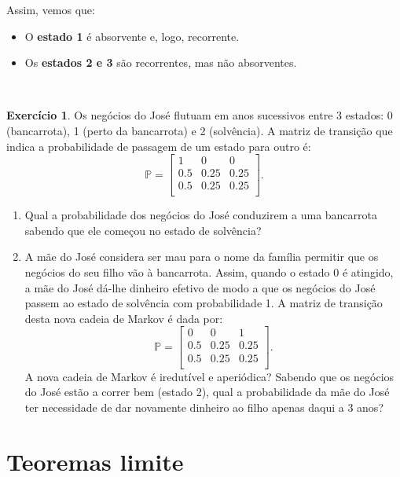 \documentclass[
  11pt,
  a4paper,
]{book}
\theoremstyle{definition}
\theoremstyle{definition}
\theoremstyle{definition}
\newtheorem{exercise}{Exercício}[chapter]
\theoremstyle{definition}
\theoremstyle{remark}
\begin{document}
Assim, vemos que:

\begin{itemize}
\item
  O \textbf{estado 1} é absorvente e, logo, recorrente.
\item
  Os \textbf{estados 2 e 3} são recorrentes, mas não absorventes.
\end{itemize}

\(\,\)

\begin{exercise}

Os negócios do José flutuam em anos sucessivos entre 3 estados: 0 (bancarrota), 1 (perto da bancarrota) e 2 (solvência). A matriz de transição que indica a probabilidade de passagem de um estado para outro é:
\[
\mathbb{P} =
\begin{bmatrix}
1 & 0 & 0   \\
0.5 & 0.25 & 0.25  \\
0.5 & 0.25 & 0.25 \\
\end{bmatrix}.
\]

\begin{enumerate}
\def\labelenumi{(\alph{enumi})}
\item
  Qual a probabilidade dos negócios do José conduzirem a uma bancarrota sabendo que ele começou no estado de solvência?
\item
  A mãe do José considera ser mau para o nome da família permitir que os negócios do seu filho vão à bancarrota. Assim, quando o estado 0 é atingido, a mãe do José dá-lhe dinheiro efetivo de modo a que os negócios do José passem ao estado de solvência com probabilidade 1. A matriz de transição desta nova cadeia de Markov é dada por:
  \[
  \mathbb{P} =
  \begin{bmatrix}
  0 & 0 & 1   \\
  0.5 & 0.25 & 0.25  \\
  0.5 & 0.25 & 0.25 \\
  \end{bmatrix}.
  \]
  A nova cadeia de Markov é iredutível e aperiódica? Sabendo que os negócios do José estão a correr bem (estado 2), qual a probabilidade da mãe do José ter necessidade de dar novamente dinheiro ao filho apenas daqui a 3 anos?
\end{enumerate}

\end{exercise}

\section{Teoremas limite}\label{teoremas-limite}
\end{document}
